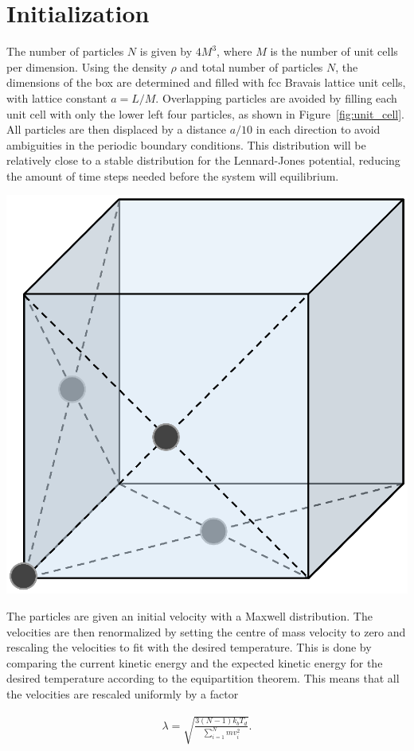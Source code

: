 \section{Initialization}
The number of particles $N$ is given by $4M^3$, where $M$ is the number of unit cells per dimension. Using the density $\rho$ and total number of particles $N$, the dimensions of the box are determined and filled with fcc Bravais lattice unit cells, with lattice constant $a=L/M$. Overlapping particles are avoided by filling each unit cell with only the lower left four particles, as shown in Figure~\ref{fig:unit_cell}. All particles are then displaced by a distance $a/10$ in each direction to avoid ambiguities in the periodic boundary conditions. This distribution will be relatively close to a stable distribution for the Lennard-Jones potential, reducing the amount of time steps needed before the system will equilibrium.
\begin{Figure}
 \centering
 \includegraphics[width=0.35\linewidth]{fcc_cell.eps}
 \label{fig:unit_cell}
\end{Figure}

The particles are given an initial velocity with a Maxwell distribution\cite{jos}. The velocities are then renormalized by setting the centre of mass velocity to zero and rescaling the velocities to fit with the desired temperature. This is done by comparing the current kinetic energy and the expected kinetic energy for the desired temperature according to the equipartition theorem. This means that all the velocities are rescaled uniformly by a factor

\begin{gather*}
\lambda = \sqrt{\frac{3\left(N-1\right)k_bT_d}{\sum_{i=1}^Nmv_i^2}}.
\end{gather*}

